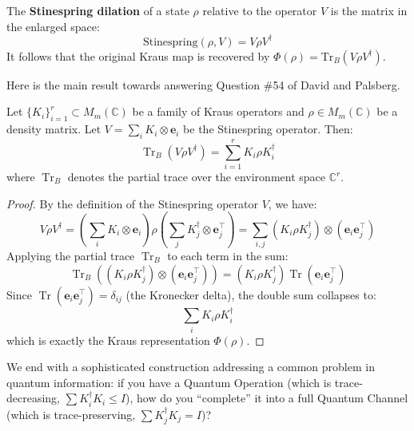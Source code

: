 \begin{definition}
The \textbf{Stinespring dilation} of a state $\rho$ relative to the operator $V$ is the matrix in the enlarged space:
\begin{equation}
    \text{Stinespring}(\rho, V) = V \rho V^\dagger
\end{equation}
It follows that the original Kraus map is recovered by $\Phi(\rho) = \text{Tr}_B(V \rho V^\dagger)$.
\end{definition}

Here is the main result towards answering Question \#54 of David and Palsberg.
\begin{theorem}
Let $\{K_i\}_{i=1}^r \subset M_m(\mathbb{C})$ be a family of Kraus operators and $\rho \in M_m(\mathbb{C})$ be a density matrix. Let $V = \sum_{i} K_i \otimes \mathbf{e}_i$ be the Stinespring operator. Then:
\begin{equation}
    \operatorname{Tr}_B(V \rho V^\dagger) = \sum_{i=1}^r K_i \rho K_i^\dagger
\end{equation}
where $\operatorname{Tr}_B$ denotes the partial trace over the environment space $\mathbb{C}^r$.
\end{theorem}

\begin{proof}
By the definition of the Stinespring operator $V$, we have:
\[ V \rho V^\dagger = \left( \sum_i K_i \otimes \mathbf{e}_i \right) \rho \left( \sum_j K_j^\dagger \otimes \mathbf{e}_j^\top \right) = \sum_{i,j} (K_i \rho K_j^\dagger) \otimes (\mathbf{e}_i \mathbf{e}_j^\top) \]
Applying the partial trace $\operatorname{Tr}_B$ to each term in the sum:
\[ \operatorname{Tr}_B((K_i \rho K_j^\dagger) \otimes (\mathbf{e}_i \mathbf{e}_j^\top)) = (K_i \rho K_j^\dagger) \operatorname{Tr}(\mathbf{e}_i \mathbf{e}_j^\top) \]
Since $\operatorname{Tr}(\mathbf{e}_i \mathbf{e}_j^\top) = \delta_{ij}$ (the Kronecker delta), the double sum collapses to:
\[ \sum_{i} K_i \rho K_i^\dagger \]
which is exactly the Kraus representation $\Phi(\rho)$.
\end{proof}

We end with a sophisticated construction addressing a common problem in quantum information: if you have a Quantum Operation (which is trace-decreasing, $\sum K_i^\dagger K_i \le I$), how do you ``complete'' it into a full Quantum Channel (which is trace-preserving, $\sum K_j^\dagger K_j = I$)?

